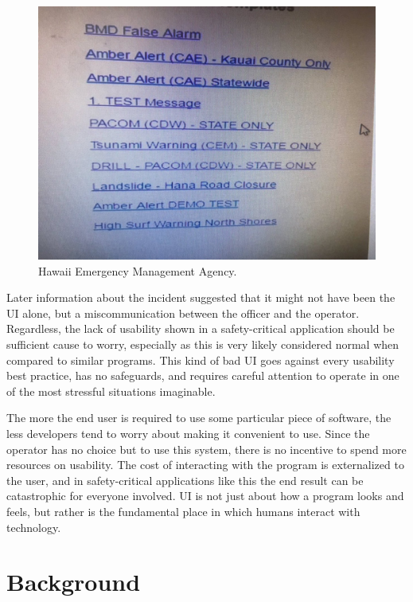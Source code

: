 \documentclass[12pt, oneside]{article}
\begin{document}
\begin{figure}
  \includegraphics[width=\linewidth]{Resources/alert.jpg}
  \caption{Hawaii Emergency Management Agency.}
  \label{fig:alert}
\end{figure}

Later information about the incident suggested that it might not have been the UI alone, but a miscommunication between the officer and the operator. Regardless, the lack of usability shown in a safety-critical application should be sufficient cause to worry, especially as this is very likely considered normal when compared to similar programs. This kind of bad UI goes against every usability best practice, has no safeguards, and requires careful attention to operate in one of the most stressful situations imaginable.

The more the end user is required to use some particular piece of software, the less developers tend to worry about making it convenient to use. Since the operator has no choice but to use this system, there is no incentive to spend more resources on usability. The cost of interacting with the program is externalized to the user, and in safety-critical applications like this the end result can be catastrophic for everyone involved. UI is not just about how a program looks and feels, but rather is the fundamental place in which humans interact with technology.

\section{Background}
\end{document}
